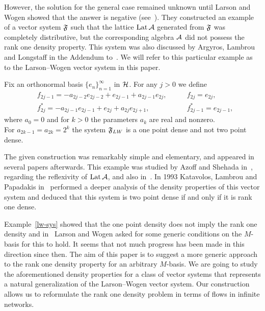 \documentclass[12pt,oneside,a4paper]{amsart}
\begin{document}
  However, the solution for the general case remained unknown until Larson and Wogen showed that the answer is negative (see~\cite{larson}).
  They constructed an example of a vector system $\fsys$ such that the lattice $\lattice$ generated from $\fsys$
    was completely distributive, but the corresponding algebra $\cal{A}$
    did not possess the rank one density property.
  This system was also discussed by Argyros, Lambrou and Longstaff in the Addendum to~\cite{argyroslambrou}.
  We will refer to this particular example as to the Larson--Wogen vector system in this paper.
  \begin{example}
    \label{lw-sys}
    Fix an orthonormal basis $\{e_n\}_{n=1}^\infty$ in $\cal{H}$. For any $j > 0$ we define
    \begin{align*}
      &f_{2j-1}=-a_{2j-2}e_{2j-2} + e_{2j-1} + a_{2j-1}e_{2j}, \qquad &f_{2j}=e_{2j},\\
      &f^*_{2j}=-a_{2j-1}e_{2j-1}+e_{2j}+a_{2j}e_{2j+1}, \qquad &f^*_{2j-1}=e_{2j-1},
    \end{align*}
    where $a_0 = 0$ and for $k > 0$ the parameters $a_k$ are real and nonzero.\\
    For $a_{2k-1}= a_{2k} = 2^k$ the system $\fsys_{LW}$ is a one point dense and not two point dense.
  \end{example}
  The given construction was remarkably simple and elementary, and appeared in several papers afterwards.
  This example was studied by Azoff and Shehada in~\cite{azoff}, regarding the reflexivity of $\lattice$, and also in~\cite{me}.
  In 1993 Katavolos, Lambrou and Papadakis in~\cite{katavolos} performed a deeper analysis of the density properties
    of this vector system and deduced that this system is two point dense if and only if it is rank one dense.

  Example~\ref{lw-sys} showed that the one point density does not imply the rank one density and
    in~\cite{larson} Larson and Wogen asked for some generic conditions on the $M$-basis
    for this to hold.
  It seems that not much progress has been made in this direction since then.
  The aim of this paper is to suggest a more generic approach to the rank one density property
    for an arbitrary $M$-basis.
  We are going to study the aforementioned density properties for a class of vector systems that represents a natural generalization of the Larson--Wogen vector system.
  Our construction allows us to reformulate the rank one density problem in terms of flows in infinite networks.
\end{document}
